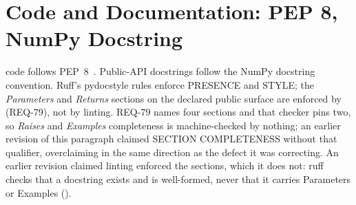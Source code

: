 \section{Code and Documentation: PEP 8, NumPy Docstring}

\itc{} code follows PEP~8~\citep{pep8}. Public-API docstrings follow the
NumPy docstring convention. Ruff's pydocstyle rules enforce PRESENCE
and STYLE; the \emph{Parameters} and \emph{Returns} sections on the
declared public surface are enforced by
 (REQ-79), not by linting.
REQ-79 names four sections and that checker pins two, so
\emph{Raises} and \emph{Examples} completeness is machine-checked by
nothing; an earlier revision of this paragraph claimed SECTION
COMPLETENESS without that qualifier, overclaiming in the same
direction as the defect it was correcting.
An earlier revision claimed linting enforced the sections,
which it does not: ruff checks that a docstring exists and is
well-formed, never that it carries Parameters or Examples
().
